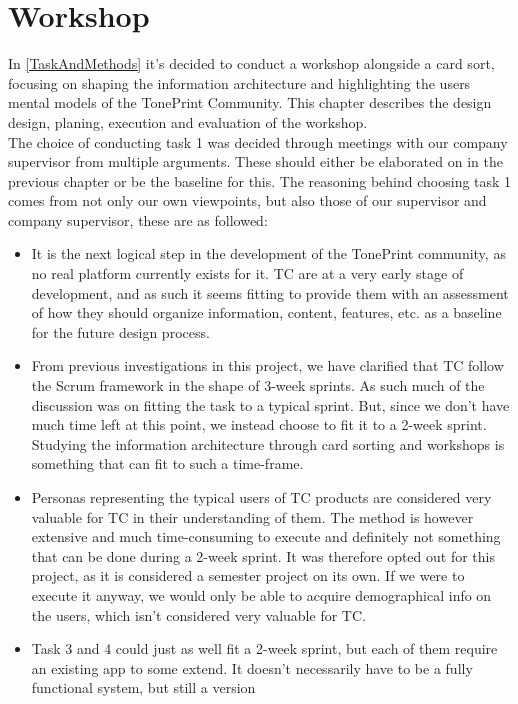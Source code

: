 \chapter{Workshop}
\label{ChapterWorkshop}
In \autoref{TaskAndMethods} it's decided to conduct a workshop alongside a card sort, focusing on shaping the information architecture and highlighting the users mental models of the TonePrint Community. This chapter describes the design design, planing, execution and evaluation of the workshop.\\

\noindent
The choice of conducting task 1 was decided through meetings with our company supervisor from multiple arguments. These should either be elaborated on in the previous chapter or be the baseline for this. The reasoning behind choosing task 1 comes from not only our own viewpoints, but also those of our supervisor and company supervisor, these are as followed:
\begin{itemize}
	\item It is the next logical step in the development of the TonePrint community, as no real platform currently exists for it. TC are at a very early stage of development, and as such it seems fitting to provide them with an assessment of how they should organize information, content, features, etc. as a baseline for the future design process.
	\item From previous investigations in this project, we have clarified that TC follow the Scrum framework in the shape of 3-week sprints. As such much of the discussion was on fitting the task to a typical sprint. But, since we don't have much time left at this point, we instead choose to fit it to a 2-week sprint. Studying the information architecture through card sorting and workshops is something that can fit to such a time-frame.
	\item Personas representing the typical users of TC products are considered very valuable for TC in their understanding of them. The method is however extensive and much time-consuming to execute and definitely not something that can be done during a 2-week sprint. It was therefore opted out for this project, as it is considered a semester project on its own. If we were to execute it anyway, we would only be able to acquire demographical info on the users, which isn't considered very valuable for TC.
	\item Task 3 and 4 could just as well fit a 2-week sprint, but each of them require an existing app to some extend. It doesn't necessarily have to be a fully functional system, but still a version 
\end{itemize}



